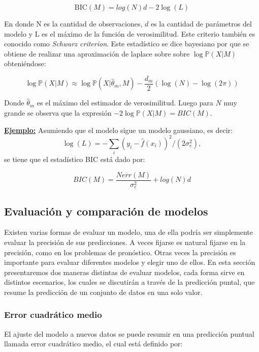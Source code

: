 \begin{equation}
\text{BIC}(M) = log(N)d-2\log(L)
\end{equation}

En donde N es la cantidad de observaciones, $d$ es la cantidad de parámetros del modelo y L es el máximo de la función de verosimilitud. Este criterio también es conocido como \emph{Schwarz criterion}. Este estadístico se dice bayesiano por que se obtiene de realizar una aproximación de laplace sobre sobre $\log\mathbb{P}(X|M)$ obteniéndose:

\begin{equation}
\log\mathbb{P}(X|M) \approx \log\mathbb{P}(X|\hat{\theta}_m, M) - \frac{d_m}{2}(\log(N)-\log(2\pi))
\end{equation}

Donde $\hat{\theta}_m$ es el máximo del estimador de verosimilitud. Luego para $N$ muy grande se observa que la expresión $-2\log\mathbb{P}(X|M) = BIC(M)$.

\textbf{\underline{Ejemplo:}} Asumiendo que el modelo sigue un modelo gaussiano, es decir:
$$
\log(L) = -\sum_{i}(y_i-\hat{f}(x_i))^2/(2\sigma_e^2),
$$se tiene que el estadístico BIC está dado por:

\begin{equation}
BIC(M) = \frac{N\overline{err}(M)}{\sigma_e^2} + log(N)d
\end{equation}


\subsection{Evaluación y comparación de modelos}
Existen varias formas de evaluar un modelo, una de ella podría ser simplemente evaluar la precisión de sus predicciones. A veces fijarse es natural fijarse en la precisión, como en los problemas de pronóstico. Otras veces la precisión es importante para evaluar diferentes modelos y elegir uno de ellos. En esta sección presentaremos dos maneras distintas de evaluar modelos, cada forma sirve en distintos escenarios, los cuales se discutirán a través de la predicción puntal, que resume la predicción de un conjunto de datos en una solo valor.

\subsubsection{Error cuadrático medio}

El ajuste del modelo a nuevos datos se puede resumir en una predicción puntual llamada error cuadrático medio, el cual está definido por:


